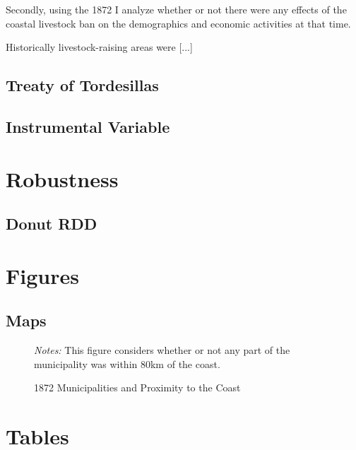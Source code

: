 \documentclass{article}
\begin{document}
Secondly, using the 1872 I analyze whether or not there were any effects of the coastal livestock ban on the demographics and economic activities at that time.




Historically livestock-raising areas were [...]


\parencite[p.~142]{De_Oliveira_Andrade1980-xz}

\subsection{Treaty of Tordesillas}

\subsection{Instrumental Variable}

\section{Robustness}
\subsection{Donut RDD}

\clearpage



\printbibliography

\clearpage

\section{Figures}
\subsection{Maps}

\begin{figure}
  \caption{1872 Municipalities and Proximity to the Coast}
  \begin{center}
  \textit{Notes:} This figure considers whether or not any part of the municipality was within 80km of the coast.
  \end{center}
  \label{fig:PlaceboMapv2}
\end{figure}

\clearpage

\section{Tables}
\end{document}

